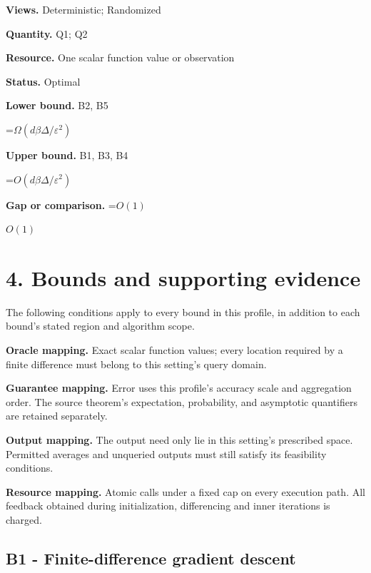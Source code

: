 \documentclass[10pt,a4paper]{article}
\newcommand{\AtlasMath}[1]{\par\begingroup\centering\setbox0=\hbox{$\displaystyle #1$}\ifdim\wd0>1.4\linewidth\typeout{ATLAS WIDE FORMULA: \the\wd0}\fi\ifdim\wd0>\linewidth\resizebox{\linewidth}{!}{\box0}\else\box0\fi\par\endgroup}
\newcommand{\AtlasInlineMath}[1]{\begingroup\setbox0=\hbox{$#1$}\ifdim\wd0>.4\linewidth\endgroup\AtlasMath{#1}\else\endgroup$#1$\fi}
\begin{document}
\textbf{Views.} Deterministic; Randomized



\textbf{Quantity.} Q1; Q2



\textbf{Resource.} One scalar function value or observation



\textbf{Status.} Optimal



\textbf{Lower bound.} B2, B5



\AtlasMath{\Omega(d\beta\Delta/\varepsilon^2)}


\textbf{Upper bound.} B1, B3, B4



\AtlasMath{O(d\beta\Delta/\varepsilon^2)}


\textbf{Gap or comparison.} \AtlasInlineMath{O(1)}



\section{4. Bounds and supporting evidence}


The following conditions apply to every bound in this profile, in addition to each bound's stated region and algorithm scope.



\textbf{Oracle mapping.} Exact scalar function values; every location required by a finite difference must belong to this setting's query domain.



\textbf{Guarantee mapping.} Error uses this profile's accuracy scale and aggregation order. The source theorem's expectation, probability, and asymptotic quantifiers are retained separately.



\textbf{Output mapping.} The output need only lie in this setting's prescribed space. Permitted averages and unqueried outputs must still satisfy its feasibility conditions.



\textbf{Resource mapping.} Atomic calls under a fixed cap on every execution path. All feedback obtained during initialization, differencing and inner iterations is charged.



\subsection{B1 - Finite-difference gradient descent}
\end{document}
